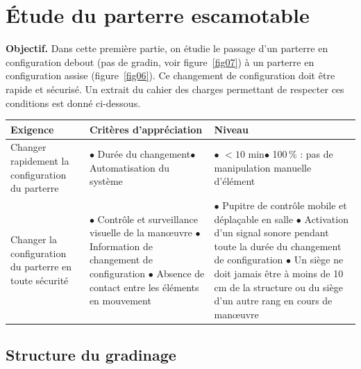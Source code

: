 \newpage

\section{Étude du parterre escamotable}

\textbf{Objectif.} Dans cette première partie, on étudie le passage d'un parterre en configuration debout (pas de gradin, voir figure~\ref{fig07}) à un parterre en configuration assise (figure~\ref{fig06}). Ce changement de configuration doit être rapide et sécurisé. Un extrait du cahier des charges permettant de respecter ces conditions est donné ci-dessous.

\begin{center}
\begin{tabular}{|p{3.2cm}|p{5.6cm}|p{6.4cm}|}
\hline
\textbf{Exigence} & \textbf{Critères d'appréciation} & \textbf{Niveau} \\
\hline
Changer rapidement la configuration du parterre &
$\bullet$ Durée du changement\newline $\bullet$ Automatisation du système &
$\bullet$ $<10$ min\newline $\bullet$ 100\,\% : pas de manipulation manuelle d'élément \\
\hline
Changer la configuration du parterre en toute sécurité &
$\bullet$ Contrôle et surveillance visuelle de la manœuvre\newline
$\bullet$ Information de changement de configuration\newline
$\bullet$ Absence de contact entre les éléments en mouvement &
$\bullet$ Pupitre de contrôle mobile et déplaçable en salle\newline
$\bullet$ Activation d'un signal sonore pendant toute la durée du changement de configuration\newline
$\bullet$ Un siège ne doit jamais être à moins de 10 cm de la structure ou du siège d'un autre rang en cours de manœuvre \\
\hline
\end{tabular}
\end{center}

\subsection{Structure du gradinage}

